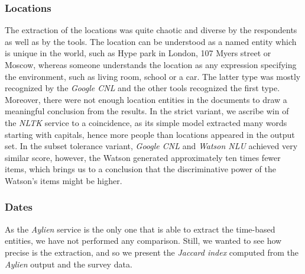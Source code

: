 \documentclass[
  digital, %
  table,   %
  lof,     %
  lot,     %
]{fithesis3}
\begin{document}
\subsubsection{\textbf{Locations}}
The extraction of the locations was quite chaotic and diverse by the respondents as well as by the tools.
The location can be understood as a named entity which is unique in the world, such as Hype park in London, 107 Myers street or Moscow, whereas someone understands the location as any expression specifying the environment, such as living room, school or a car.
The latter type was mostly recognized by the \textit{Google CNL} and the other tools recognized the first type.
Moreover, there were not enough location entities in the documents to draw a meaningful conclusion from the results.
In the strict variant, we ascribe win of the \textit{NLTK} service to a coincidence, as its simple model extracted many words starting with capitals, hence more people than locations appeared in the output set.
In the subset tolerance variant, \textit{Google CNL} and \textit{Watson NLU} achieved very similar score, however, the Watson generated approximately ten times fewer items, which brings us to a conclusion that the discriminative power of the Watson's items might be higher.

\subsubsection{\textbf{Dates}}
As the \textit{Aylien} service is the only one that is able to extract the time-based entities, we have not performed any comparison.
Still, we wanted to see how precise is the extraction, and so we present the \textit{Jaccard index} computed from the \textit{Aylien} output and the survey data.
\end{document}
